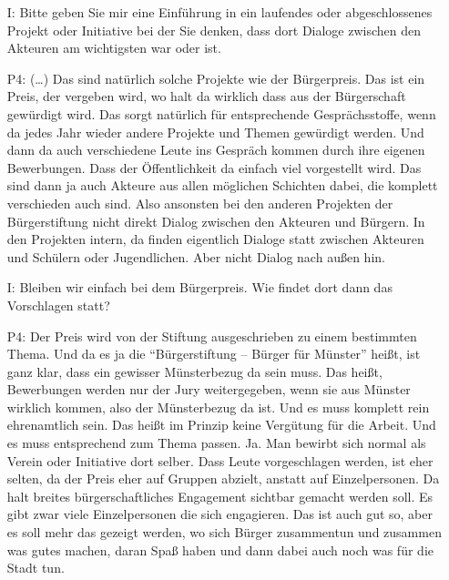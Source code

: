 \begin{itemize}
    \item[I:] Bitte geben Sie mir eine Einf{\"u}hrung in ein laufendes oder abgeschlossenes Projekt oder Initiative bei der Sie denken, dass dort Dialoge zwischen den Akteuren am wichtigsten war oder ist.
    \item[P4:] (\dots) Das sind nat{\"u}rlich solche Projekte wie der B{\"u}rgerpreis. Das ist ein Preis, der vergeben wird, wo halt da wirklich dass aus der B{\"u}rgerschaft gew{\"u}rdigt wird. Das sorgt nat{\"u}rlich f{\"u}r entsprechende Gespr{\"a}chsstoffe, wenn da jedes Jahr wieder andere Projekte und Themen gew{\"u}rdigt werden. Und dann da auch verschiedene Leute ins Gespr{\"a}ch kommen durch ihre eigenen Bewerbungen. Dass der {\"O}ffentlichkeit da einfach viel vorgestellt wird. Das sind dann ja auch Akteure aus allen m{\"o}glichen Schichten dabei, die komplett verschieden auch sind. Also ansonsten bei den anderen Projekten der B{\"u}rgerstiftung nicht direkt Dialog zwischen den Akteuren und B{\"u}rgern. In den Projekten intern, da finden eigentlich Dialoge statt zwischen Akteuren und Sch{\"u}lern oder Jugendlichen. Aber nicht Dialog nach au{\ss}en hin.
    \item[I:] Bleiben wir einfach bei dem B{\"u}rgerpreis. Wie findet dort dann das Vorschlagen statt?
    \item[P4:] Der Preis wird von der Stiftung ausgeschrieben zu einem bestimmten Thema. Und da es ja die "`B{\"u}rgerstiftung -- B{\"u}rger f{\"u}r M{\"u}nster"' hei{\ss}t, ist ganz klar, dass ein gewisser M{\"u}nsterbezug da sein muss. Das hei{\ss}t, Bewerbungen werden nur der Jury weitergegeben, wenn sie aus M{\"u}nster wirklich kommen, also der M{\"u}nsterbezug da ist. Und es muss komplett rein ehrenamtlich sein. Das hei{\ss}t im Prinzip keine Verg{\"u}tung f{\"u}r die Arbeit. Und es muss entsprechend zum Thema passen. Ja. Man bewirbt sich normal als Verein oder Initiative dort selber. Dass Leute vorgeschlagen werden, ist eher selten, da der Preis eher auf Gruppen abzielt, anstatt auf Einzelpersonen. Da halt breites b{\"u}rgerschaftliches Engagement sichtbar gemacht werden soll. Es gibt zwar viele Einzelpersonen die sich engagieren. Das ist auch gut so, aber es soll mehr das gezeigt werden, wo sich B{\"u}rger zusammentun und zusammen was gutes machen, daran Spa{\ss} haben und dann dabei auch noch was f{\"u}r die Stadt tun.
\end{itemize}

